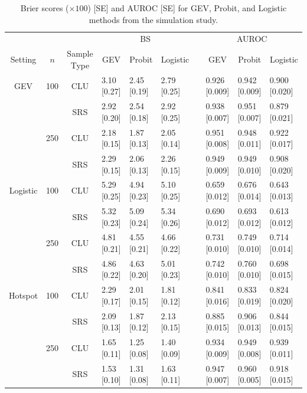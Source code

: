 \begin{table}
  \caption{Brier scores ($\times 100$) [SE] and AUROC [SE] for GEV, Probit, and Logistic methods from the simulation study.}
  \label{rbtbl:simbsresults}
  \centering
  \scriptsize
  \begin{tabular}{ccclllclll}
  \toprule
    \multicolumn{3}{c}{ }& \multicolumn{3}{c}{BS} & \phantom{abc} & \multicolumn{3}{c}{AUROC}\\
    \cmidrule{4-6} \cmidrule{8-10}
    \multicolumn{1}{c}{Setting} & \multicolumn{1}{c}{$n$} & \multicolumn{1}{c}{Sample Type} & \multicolumn{1}{c}{GEV}    & \multicolumn{1}{c}{Probit} & \multicolumn{1}{c}{Logistic} & \phantom{abc} & \multicolumn{1}{c}{GEV}    & \multicolumn{1}{c}{Probit} & \multicolumn{1}{c}{Logistic} \\
  \midrule
  GEV & 100 & CLU & 3.10 [0.27] & 2.45 [0.19] & 2.79 [0.25] && 0.926
      [0.009] & 0.942 [0.009] & 0.900 [0.020]\\
      &     & SRS & 2.92 [0.20] & 2.54 [0.18] & 2.92 [0.25] && 0.938 [0.007] & 0.951 [0.007] & 0.879 [0.021]\\
      & 250 & CLU & 2.18 [0.15] & 1.87 [0.13] & 2.05 [0.14] && 0.951 [0.008] & 0.948 [0.011] & 0.922 [0.017]\\
      &     & SRS & 2.29 [0.15] & 2.06 [0.13] & 2.26 [0.15] && 0.949 [0.009] & 0.949 [0.010] & 0.908 [0.020]\\
  \midrule
  Logistic & 100 & CLU & 5.29 [0.25] & 4.94 [0.23] & 5.10 [0.25] && 
           0.659 [0.012] & 0.676 [0.014] & 0.643 [0.013]\\
           &     & SRS & 5.32 [0.23] & 5.09 [0.24] & 5.34 [0.26] && 0.690 [0.012] & 0.693 [0.012] & 0.613 [0.012]\\
           & 250 & CLU & 4.81 [0.21] & 4.55 [0.21] & 4.66 [0.22] && 0.731 [0.010] & 0.749 [0.010] & 0.714 [0.014]\\
           &     & SRS & 4.86 [0.22] & 4.63 [0.20] & 5.01 [0.23] && 0.742 [0.010] & 0.760 [0.010] & 0.698 [0.015]\\
  \midrule
  Hotspot & 100 & CLU & 2.29 [0.17] & 2.01 [0.15] & 1.81 [0.12] && 
          0.841 [0.016] & 0.833 [0.019] & 0.824 [0.020]\\
          &     & SRS & 2.09 [0.13] & 1.87 [0.12] & 2.13 [0.15] && 0.885 [0.015] &  0.906 [0.013] & 0.844 [0.015]\\
          & 250 & CLU & 1.65 [0.11] & 1.25 [0.08] & 1.40 [0.09] && 0.934 [0.009] &  0.949 [0.008] & 0.939 [0.011]\\
          &     & SRS & 1.53 [0.10] & 1.31 [0.08] & 1.63 [0.11] && 0.947 [0.007] &  0.960 [0.005] & 0.918 [0.015]\\
  \bottomrule
  \end{tabular}
\end{table}


